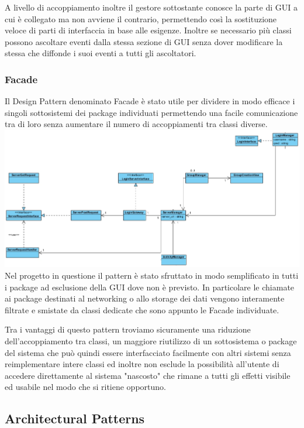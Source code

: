 \documentclass[12pt]{scrartcl}
\begin{document}
A livello di accoppiamento inoltre il gestore sottostante conosce
la parte di GUI a cui \`e collegato ma non avviene il contrario, 
permettendo cos\`i la sostituzione veloce di parti di interfaccia
in base alle esigenze. Inoltre se necessario pi\`u classi possono
ascoltare eventi dalla stessa sezione di GUI senza dover modificare
la stessa che diffonde i suoi eventi a tutti gli ascoltatori.
\subsubsection{Facade}
Il Design Pattern denominato Facade \`e stato utile per dividere
in modo efficace i singoli sottosistemi dei package individuati
permettendo una facile comunicazione tra di loro senza aumentare
il numero di accoppiamenti tra classi diverse.\\
    \includegraphics[scale=0.40]{1.png}
Nel progetto in questione il pattern \`e stato sfruttato in modo
semplificato in tutti i package ad esclusione della GUI dove
non \`e previsto. In particolare le chiamate ai package destinati
al networking o allo storage dei dati vengono interamente filtrate
e smistate da classi dedicate che sono appunto le Facade individuate.

Tra i vantaggi di questo pattern troviamo sicuramente una riduzione
dell'accoppiamento tra classi, un maggiore riutilizzo di un sottosistema
o package del sistema che pu\`o quindi essere interfacciato facilmente
con altri sistemi senza reimplementare intere classi ed inoltre non
esclude la possibilit\`a all'utente di accedere direttamente al
sistema "nascosto" che rimane a tutti gli effetti visibile ed
usabile nel modo che si ritiene opportuno.
\subsection{Architectural Patterns}
\end{document}
